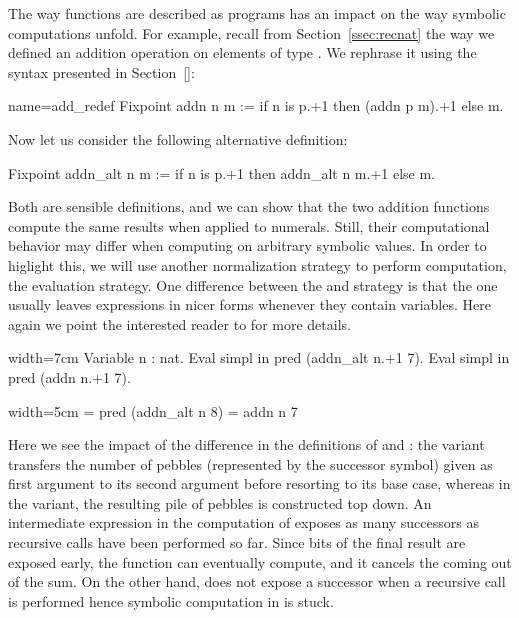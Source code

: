 The way functions are described as programs has an impact on the way
symbolic computations unfold. For example, recall from
Section~\ref{ssec:recnat} the way we defined an addition operation on
elements of type . We rephrase it using the  syntax presented in Section~\ref{}:

\begin{coq}{name=add_redef}{}
Fixpoint addn n m := if n is p.+1 then (addn p m).+1 else m.
\end{coq}

Now let us consider the following alternative definition:

\begin{coq}{}{}
Fixpoint addn_alt n m := if n is p.+1 then addn_alt n m.+1 else m.
\end{coq}

Both are sensible definitions, and we can show that the two addition
functions compute the same results when applied to numerals.  Still,
their computational behavior may differ when computing on arbitrary
symbolic values. In order to higlight this, we will use another
normalization strategy to perform computation, the 
evaluation strategy.  One difference between the 
and  strategy is that the  one usually leaves
expressions in nicer forms whenever they contain variables. Here again
we point the interested reader to \cite[Section 8.7.1]{Coq:manual} for
more details.

\begin{coq}{}{width=7cm}
Variable n : nat.
Eval simpl in pred (addn_alt n.+1 7).
Eval simpl in pred (addn n.+1 7).
\end{coq}
\begin{coqout}{}{width=5cm}
= pred (addn_alt n 8)
= addn n 7
\end{coqout}

Here we see the impact of the difference in the definitions of
 and : the  variant transfers the
number of pebbles (represented by the successor  symbol)
given as first argument to its second argument
before resorting to its base case, whereas in the  variant,
the resulting pile of pebbles is constructed top down. An intermediate
expression in the computation of  exposes as many
successors as recursive calls have been performed so far. Since bits
of the final result are exposed early, the  function can
eventually compute, and it cancels the  coming out of the sum.
On the other hand,
 does not expose a successor when a recursive call is
performed hence symbolic computation in  is stuck.

